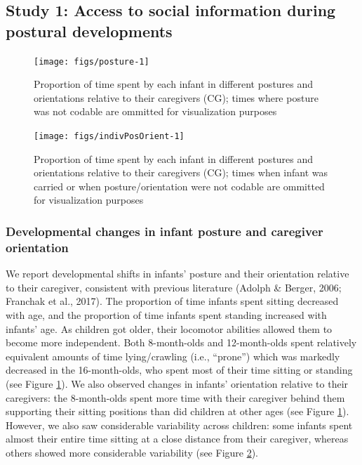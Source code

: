 \documentclass[english,man]{apa6}
\begin{document}
\subsection{Study 1: Access to social information during postural
developments}\label{study-1-access-to-social-information-during-postural-developments}

\begin{figure}[H]
\texttt{[image: figs/posture-1]} \caption{Proportion of time spent by each infant in different postures and orientations relative to their caregivers (CG); times where posture was not codable are ommitted for visualization purposes}\label{fig:posture}
\end{figure}

\begin{figure}[H]
\texttt{[image: figs/indivPosOrient-1]} \caption{Proportion of time spent by each infant in different postures and orientations relative to their caregivers (CG); times when infant was carried or when posture/orientation were not codable are ommitted for visualization purposes}\label{fig:indivPosOrient}
\end{figure}

\subsubsection{Developmental changes in infant posture and caregiver
orientation}\label{developmental-changes-in-infant-posture-and-caregiver-orientation}

We report developmental shifts in infants' posture and their orientation
relative to their caregiver, consistent with previous literature (Adolph
\& Berger, 2006; Franchak et al., 2017). The proportion of time infants
spent sitting decreased with age, and the proportion of time infants
spent standing increased with infants' age. As children got older, their
locomotor abilities allowed them to become more independent. Both
8-month-olds and 12-month-olds spent relatively equivalent amounts of
time lying/crawling (i.e., \enquote{prone}) which was markedly decreased
in the 16-month-olds, who spent most of their time sitting or standing
(see Figure \ref{fig:posture}). We also observed changes in infants'
orientation relative to their caregivers: the 8-month-olds spent more
time with their caregiver behind them supporting their sitting positions
than did children at other ages (see Figure \ref{fig:posture}). However,
we also saw considerable variability across children: some infants spent
almost their entire time sitting at a close distance from their
caregiver, whereas others showed more considerable variability (see
Figure \ref{fig:indivPosOrient}).
\end{document}
